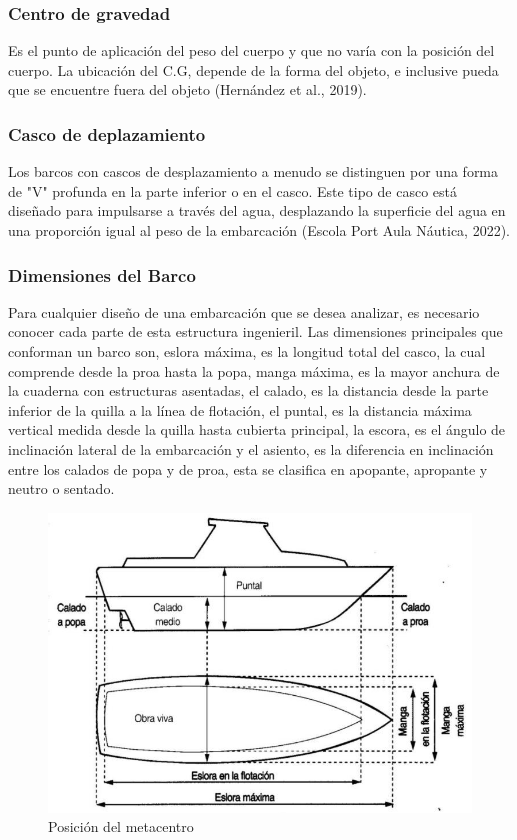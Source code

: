 \documentclass[a4paper,letterpaper]{article}
\begin{document}
\subsubsection*{Centro de gravedad}
\setlength{\parindent}{18pt}
Es el punto de aplicación del peso del cuerpo y que no varía con la posición del cuerpo. La ubicación del C.G, 
depende de la forma del objeto, e inclusive pueda que se encuentre fuera del objeto (Hernández et al., 2019).

\subsubsection*{Casco de deplazamiento}
\setlength{\parindent}{18pt}
Los barcos con cascos de desplazamiento a menudo se distinguen por una forma de "V" profunda en la parte 
inferior o en el casco. Este tipo de casco está diseñado para impulsarse a través del agua, desplazando 
la superficie del agua en una proporción igual al peso de la embarcación (Escola Port Aula Náutica, 2022).
\subsubsection*{Dimensiones del Barco}
\setlength{\parindent}{18pt}
Para cualquier diseño de una embarcación que se desea analizar, es necesario conocer cada parte de esta 
estructura ingenieril. Las dimensiones principales que conforman un barco son, eslora máxima, es la longitud 
total del casco, la cual comprende desde la proa hasta la popa, manga máxima, es la mayor anchura de la 
cuaderna con estructuras asentadas, el calado, es la distancia desde la parte inferior de la quilla a la 
línea de flotación, el puntal, es la distancia máxima vertical medida desde la quilla hasta cubierta 
principal, la escora, es el ángulo de inclinación lateral de la embarcación y el asiento, es la diferencia
 en inclinación entre los calados de popa y de proa, esta se clasifica en apopante, apropante y neutro o sentado.
 \begin{figure}[h]
	\centering
	\includegraphics[width=0.5 \textwidth]{dimensionestemporal.jpg}
	\caption{ Posición del metacentro}
	\label{fig:imagen}
\end{figure}
\end{document}
